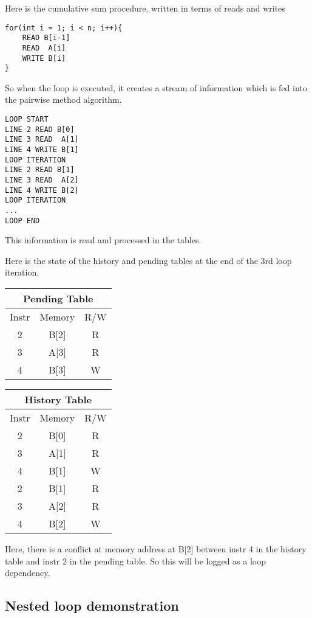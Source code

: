 \documentclass[12pt,twoside]{reedthesis}
\begin{document}
		Here is the cumulative sum procedure, written in terms of reads and writes
		
		\begin{lstlisting}
for(int i = 1; i < n; i++){
	READ B[i-1]
	READ  A[i]
	WRITE B[i]
}
		\end{lstlisting}
		
		So when the loop is executed, it creates a stream of information which is fed into the pairwise method algorithm. 
		\begin{lstlisting}
LOOP START
LINE 2 READ B[0]
LINE 3 READ  A[1]
LINE 4 WRITE B[1]
LOOP ITERATION
LINE 2 READ B[1]
LINE 3 READ  A[2]
LINE 4 WRITE B[2]
LOOP ITERATION
...
LOOP END
		\end{lstlisting}
		
		This information is read and processed in the tables. 
		
		Here is the state of the history and pending tables at the end of the 3rd loop iteration. 
		
		\begin{tabular}{ |c|c|c| } 
			\hline
			\multicolumn{3}{|c|}{Pending Table} \\
			\hline
			Instr & Memory & R/W \\ 
			\hline
			2 & B[2] & R \\ 
			3 & A[3] & R \\ 
			4 & B[3] & W \\ 
			\hline
		\end{tabular}
		\begin{tabular}{ |c|c|c| } 
			\hline
			\multicolumn{3}{|c|}{History Table} \\
			\hline
			Instr & Memory & R/W \\ 
			\hline
			2 & B[0] & R \\ 
			3 & A[1] & R \\ 
			4 & B[1] & W \\ 
			2 & B[1] & R \\ 
			3 & A[2] & R \\ 
			4 & B[2] & W \\ 
			\hline
		\end{tabular}
		
		Here, there is a conflict at memory address at B[2] between instr 4 in the history table and instr 2 in the pending table. So this will be logged as a loop dependency. 
		
		\subsection{Nested loop demonstration}
		
\end{document}
